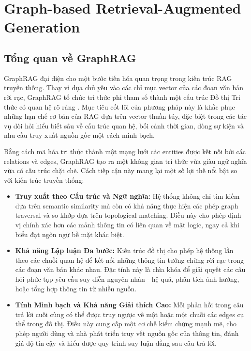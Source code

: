 \section{Graph-based Retrieval-Augmented Generation}

\subsection{Tổng quan về GraphRAG}

GraphRAG đại diện cho một bước tiến hóa quan trọng trong kiến trúc RAG truyền thống. Thay vì dựa chủ yếu vào các chỉ mục vector của các đoạn văn bản rời rạc, GraphRAG tổ chức tri thức phi tham số thành một cấu trúc Đồ thị Tri thức có quan hệ rõ ràng \cite{lewis2020rag}. Mục tiêu cốt lõi của phương pháp này là khắc phục những hạn chế cơ bản của RAG dựa trên vector thuần túy, đặc biệt trong các tác vụ đòi hỏi hiểu biết sâu về cấu trúc quan hệ, bối cảnh thời gian, dòng sự kiện và nhu cầu truy xuất nguồn gốc một cách minh bạch.

Bằng cách mã hóa tri thức thành một mạng lưới các entities được kết nối bởi các relations và edges, GraphRAG tạo ra một không gian tri thức vừa giàu ngữ nghĩa vừa có cấu trúc chặt chẽ. Cách tiếp cận này mang lại một số lợi thế nổi bật so với kiến trúc truyền thống:

\begin{itemize}
    \item \textbf{Truy xuất theo Cấu trúc và Ngữ nghĩa:} Hệ thống không chỉ tìm kiếm dựa trên semantic similarity mà còn có khả năng thực hiện các phép graph traversal và so khớp dựa trên topological matching. Điều này cho phép định vị chính xác hơn các mảnh thông tin có liên quan về mặt logic, ngay cả khi biểu đạt ngôn ngữ bề mặt khác biệt.

    \item \textbf{Khả năng Lập luận Đa bước:} Kiến trúc đồ thị cho phép hệ thống lần theo các chuỗi quan hệ để kết nối những thông tin tưởng chừng rời rạc trong các đoạn văn bản khác nhau. Đặc tính này là chìa khóa để giải quyết các câu hỏi phức tạp yêu cầu suy diễn nguyên nhân - hệ quả, phân tích ảnh hưởng, hoặc tổng hợp thông tin từ nhiều nguồn.

    \item \textbf{Tính Minh bạch và Khả năng Giải thích Cao:} Mỗi phản hồi trong câu trả lời cuối cùng có thể được truy ngược về một hoặc một chuỗi các edges cụ thể trong đồ thị. Điều này cung cấp một cơ chế kiểm chứng mạnh mẽ, cho phép người dùng và nhà phát triển truy vết nguồn gốc của thông tin, đánh giá độ tin cậy và hiểu được quy trình suy luận đằng sau câu trả lời.
\end{itemize}

